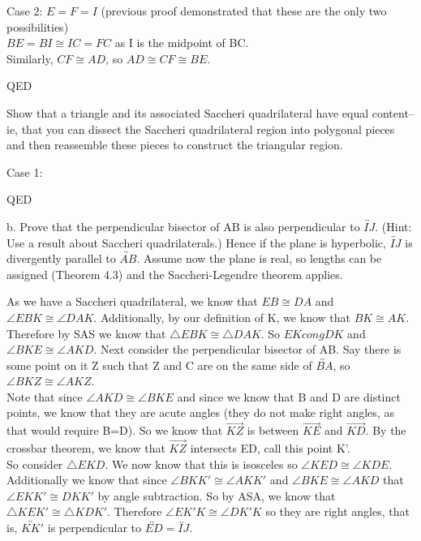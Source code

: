 \documentclass[12pt,letterpaper]{article}
\newcommand{\Proof}{\noindent {\bf Proof: }}
\newcommand{\QED}{\begin{flushright}QED\end{flushright}}
\begin{document}
\noindent Case 2: $E = F = I$ (previous proof demonstrated that these are the only two possibilities)\\

$BE = BI \cong IC = FC$ as I is the midpoint of BC.\\

Similarly, $CF \cong AD$, so $AD \cong CF \cong BE$.

\QED


\newpage

Show that a triangle and its associated Saccheri quadrilateral have equal content-- ie, that you can dissect the Saccheri quadrilateral region into polygonal pieces and then reassemble these pieces to construct the triangular region. \\

\Proof

Case 1: 

\QED


\newpage 

b. Prove that the perpendicular bisector of AB is also perpendicular to $\overleftrightarrow{IJ}$. (Hint: Use a result about Saccheri quadrilaterals.)  Hence if the plane is hyperbolic, $\overleftrightarrow{IJ}$ is divergently parallel to $\overleftrightarrow{AB}$.  Assume now the plane is real, so lengths can be assigned (Theorem 4.3) and the Saccheri-Legendre theorem applies. \\

\Proof

As we have a Saccheri quadrilateral, we know that $EB \cong DA$ and $\angle EBK \cong \angle DAK$.  Additionally, by our definition of K, we know that $BK \cong AK$.  Therefore by SAS we know that $\triangle EBK \cong \triangle DAK$.  So $EK cong DK$ and $\angle BKE \cong \angle AKD$.  Next consider the perpendicular bisector of AB.  Say there is some point on it Z such that Z and C are on the same side of $\overleftrightarrow{BA}$, so $\angle BKZ \cong \angle AKZ$. \\

Note that since $\angle AKD \cong \angle BKE$ and since we know that B and D are distinct points, we know that they are acute angles (they do not make right angles, as that would require B=D). So we know that $\overrightarrow{KZ}$ is between $\overrightarrow{KE}$ and $\overrightarrow{KD}$.  By the crossbar theorem, we know that $\overrightarrow{KZ}$ intersects ED, call this point K'.\\

So consider $\triangle EKD$.  We now know that this is isosceles so $\angle KED \cong \angle KDE$. Additionally we know that since $\angle BKK' \cong \angle AKK'$ and $\angle BKE \cong \angle AKD$ that $\angle EKK' \cong  DKK'$ by angle subtraction.  So by ASA, we know that $\triangle KEK' \cong\triangle KDK'$.  Therefore $\angle EK'K \cong \angle DK'K$ so they are right angles, that is, $\overleftrightarrow{KK'}$ is perpendicular to $\overleftrightarrow{ED} = \overleftrightarrow{IJ}$. 
\end{document}
